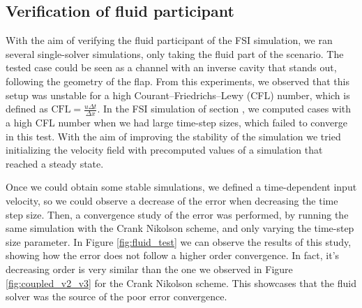 \documentclass[
  english,        %
  font=times,     %
  onecolumn,      %
]{tumarticle}
\begin{document}
\subsection{Verification of fluid participant} \label{sec:fluid-part}
With the aim of verifying the fluid participant of the FSI simulation, we ran several single-solver simulations, only taking the fluid part of the scenario. The tested case could be seen as a channel with an inverse cavity that stands out, following the geometry of the flap. From this experiments, we observed that this setup was unstable for a high Courant–Friedrichs–Lewy (CFL) number, which is defined as $\text{CFL} = \frac{u \Delta t}{\Delta x}$. In the FSI simulation of section \label{sec:FSI}, we computed cases with a high CFL number when we had large time-step sizes, which failed to converge in this test. With the aim of improving the stability of the simulation we tried initializing the velocity field with precomputed values of a simulation that reached a steady state.

Once we could obtain some stable simulations, we defined a time-dependent input velocity, so we could observe a decrease of the error when decreasing the time step size. Then, a convergence study of the error was performed, by running the same simulation with the Crank Nikolson scheme, and only varying the time-step size parameter. In Figure \ref{fig:fluid_test} we can observe the results of this study, showing how the error does not follow a higher order convergence. In fact, it's decreasing order is very similar than the one we observed in Figure \ref{fig:coupled_v2_v3} for the Crank Nikolson scheme. This showcases that the fluid solver was the source of the poor error convergence.


\end{document}

